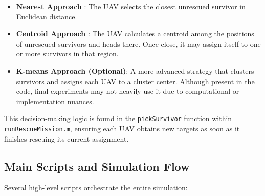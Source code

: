 \documentclass[12pt,a4paper]{report}
\begin{document}
\begin{itemize}
    \item \textbf{Nearest Approach} \cite{Ghassemi2021NearestNeighbor}: 
          The UAV selects the closest unrescued survivor in Euclidean distance.
    \item \textbf{Centroid Approach} \cite{Ho2016CentroidAssign}: 
          The UAV calculates a centroid among the positions of unrescued survivors
          and heads there. Once close, it may assign itself to one or more survivors
          in that region.
    \item \textbf{K-means Approach (Optional)}:
          A more advanced strategy that clusters survivors and assigns each UAV to
          a cluster center. Although present in the code, final experiments may not
          heavily use it due to computational or implementation nuances.
\end{itemize}

This decision-making logic is found in the \texttt{pickSurvivor} function within
\texttt{runRescueMission.m}, ensuring each UAV obtains new targets as soon as it
finishes rescuing its current assignment.

\subsection{Main Scripts and Simulation Flow}
\label{sec:main_scripts}
Several high-level scripts orchestrate the entire simulation:
\end{document}
